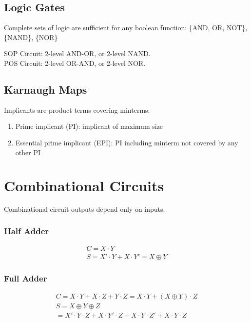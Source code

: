 \documentclass[12pt, a4paper]{article}
\begin{document}
\begin{multicols*}{3}
\subsection{Logic Gates}
{\centering
{}
\par}
Complete sets of logic are sufficient for any boolean function: \{AND, OR, NOT\}, \{NAND\}, \{NOR\}

SOP Circuit: 2-level AND-OR, or 2-level NAND.\\
POS Circuit: 2-level OR-AND, or 2-level NOR. 

\subsection{Karnaugh Maps}

Implicants are product terms covering minterms:
\begin{enumerate}
  \item Prime implicant (PI): implicant of maximum size
  \item Essential prime implicant (EPI): PI including minterm not covered by any other PI
\end{enumerate}



\colbreak
\section{Combinational Circuits}
Combinational circuit outputs depend only on inputs.

\subsubsection{Half Adder}
{\centering{}\par}
\vspace{-3em}
\begin{gather*}
  C = X\cdot Y\\
  S = X'\cdot Y + X\cdot Y' = X \oplus Y
\end{gather*}
\vspace{-2em}
\subsubsection{Full Adder}
{\centering{}\par}
\vspace{-3em}
\begin{gather*}
  C = X\cdot Y + X\cdot Z + Y\cdot Z = X\cdot Y + (X \oplus Y)\cdot Z\\
  S = X\oplus Y\oplus Z\\
  = X'\cdot Y\cdot Z + X\cdot Y'\cdot Z + X\cdot Y\cdot Z' + X\cdot Y\cdot Z
\end{gather*}
\vspace{-2em}

\end{multicols*}
\end{document}
